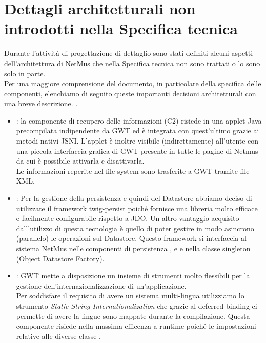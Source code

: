 \chapter{Dettagli architetturali non introdotti nella Specifica tecnica}
\thispagestyle{fancy} %
Durante l'attivit\`a di progettazione di dettaglio sono stati definiti alcuni
aspetti dell'architettura di NetMus che nella Specifica tecnica non sono
trattati o lo sono solo in parte.\\ Per una maggiore comprensione del documento,
in particolare della specifica delle componenti, elenchiamo di seguito queste
importanti decisioni architetturali con una breve descrizione.
.
\begin{itemize}
  \item {} : la componente di recupero delle informazioni (C2) risiede
  in una applet Java precompilata indipendente da GWT ed \`e integrata con
  quest'ultimo grazie ai metodi nativi JSNI. L'applet \`e inoltre visibile
  (indirettamente) all'utente con una piccola interfaccia grafica di GWT
  presente in tutte le pagine di Netmus da cui \`e possibile attivarla e
  disattivarla.\\ Le informazioni reperite nel file system sono trasferite
  a GWT tramite file XML.
  
  \item {} : Per la gestione della persistenza e quindi del
  Datastore abbiamo deciso di utilizzate il framework twig-persist poich\'e
  fornisce una libreria molto efficace e facilmente configurabile
  rispetto a JDO. Un altro vantaggio acquisito dall'utilizzo di questa
  tecnologia \`e quello di poter gestire in modo asincrono (parallelo) le
  operazioni sul Datastore. Questo framework si interfaccia al sistema NetMus
  nelle componenti di persistenza ,  e
   e nella classe singleton  (Object Datastore
  Factory).
  
  \item {} : GWT mette a disposizione un insieme di
  strumenti molto flessibili per la gestione dell'internazionalizzazione di
  un'applicazione.\\ Per soddisfare il requisito di avere un sistema
  multi-lingua utilizziamo lo strumento \emph{Static String
  Internationalization} che grazie al deferred binding ci permette di avere la
  lingue sono mappate durante la compilazione. Questa componente risiede nella
  massima efficenza a runtime poich\'e le impostazioni relative alle diverse
  classe .
\end{itemize}

